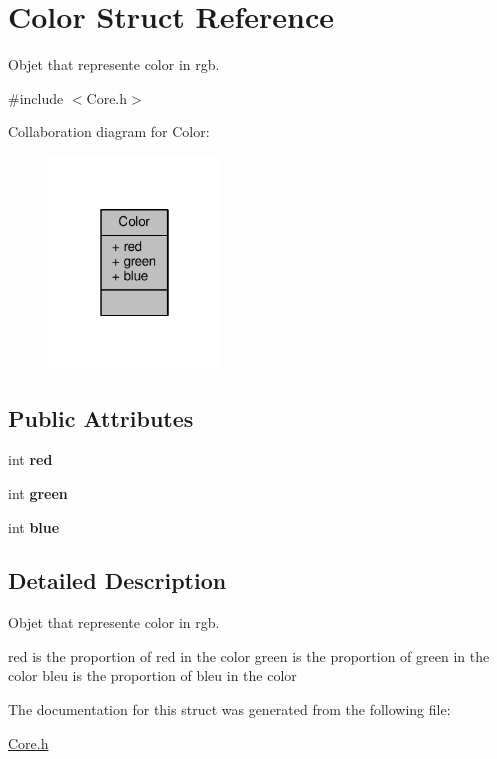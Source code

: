 \hypertarget{structColor}{\section{Color Struct Reference}
\label{structColor}
}


Objet that represente color in rgb.  




{\ttfamily \#include $<$Core.\-h$>$}



Collaboration diagram for Color\-:
\nopagebreak
\begin{figure}[H]
\begin{center}
\leavevmode
\includegraphics[width=130pt]{structColor__coll__graph}
\end{center}
\end{figure}
\subsection*{Public Attributes}
\begin{DoxyCompactItemize}
\item 
\hypertarget{structColor_a3cd71f006939f83ecd756f0ed28db40e}{int {\bfseries red}}\label{structColor_a3cd71f006939f83ecd756f0ed28db40e}

\item 
\hypertarget{structColor_afc8d0d81900a12497d1ce001e52b7020}{int {\bfseries green}}\label{structColor_afc8d0d81900a12497d1ce001e52b7020}

\item 
\hypertarget{structColor_a51f2c5eb0ffc788331255fa1c7812880}{int {\bfseries blue}}\label{structColor_a51f2c5eb0ffc788331255fa1c7812880}

\end{DoxyCompactItemize}


\subsection{Detailed Description}
Objet that represente color in rgb. 

red is the proportion of red in the color green is the proportion of green in the color bleu is the proportion of bleu in the color 

The documentation for this struct was generated from the following file\-:\begin{DoxyCompactItemize}
\item 
\hyperlink{Core_8h}{Core.\-h}\end{DoxyCompactItemize}
